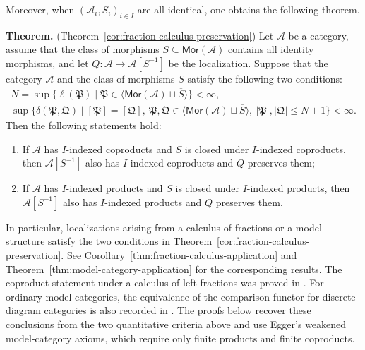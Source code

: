\documentclass[10pt,a4paper]{amsart}
\theoremstyle{plain}
\theoremstyle{definition}
\theoremstyle{remark}
\begin{document}
\medskip

Moreover, when $(\mathcal{A}_i, S_i)_{i \in I}$ are all identical, one obtains the following theorem.

\medskip

\noindent\textbf{Theorem.}  (Theorem~\ref{cor:fraction-calculus-preservation}) Let $\mathcal{A}$ be a category, assume that the class of morphisms $S \subseteq \mathsf{Mor}(\mathcal{A})$ contains all identity morphisms, and let $Q : \mathcal{A} \longrightarrow \mathcal{A}[S^{-1}]$ be the localization.
Suppose that the category $\mathcal{A}$ and the class of morphisms $S$ satisfy the following two conditions:
\begin{align*}
  N = \sup \big\{\ell(\mathfrak P) \mid \mathfrak P\in \langle\mathsf{Mor}(\mathcal A)\sqcup\overline{S}\rangle\big\} < \infty, \\
  \sup\big\{ \delta(\mathfrak P,\mathfrak Q) \mid [\mathfrak P]=[\mathfrak Q], \ \mathfrak P, \mathfrak Q\in \langle\mathsf{Mor}(\mathcal A)\sqcup\overline{S}\rangle, \ |\mathfrak P|, |\mathfrak Q| \leq N+1\big\} < \infty.
\end{align*}
Then the following statements hold:
\begin{enumerate}[label=\textup{(\arabic*)}]
  \item If $\mathcal{A}$ has $I$-indexed coproducts and $S$ is closed under $I$-indexed coproducts, then $\mathcal{A}[S^{-1}]$ also has $I$-indexed coproducts and $Q$ preserves them;
  \item If $\mathcal{A}$ has $I$-indexed products and $S$ is closed under $I$-indexed products, then $\mathcal{A}[S^{-1}]$ also has $I$-indexed products and $Q$ preserves them.
\end{enumerate}

\medskip

In particular, localizations arising from a calculus of fractions or a model structure satisfy the two conditions in Theorem~\ref{cor:fraction-calculus-preservation}.
See Corollary~\ref{thm:fraction-calculus-application} and Theorem~\ref{thm:model-category-application} for the corresponding results.
The coproduct statement under a calculus of left fractions was proved in \cite[Proposition~3.5.1]{KrauseLocalizationTheory}.
For ordinary model categories, the equivalence of the comparison functor for discrete diagram categories is also recorded in \cite[Section~2.5, equation~(2.7) and footnote~14, pp.~41--42]{RiehlHomotopicalCategories}.
The proofs below recover these conclusions from the two quantitative criteria above and use Egger's weakened model-category axioms, which require only finite products and finite coproducts.
\end{document}
